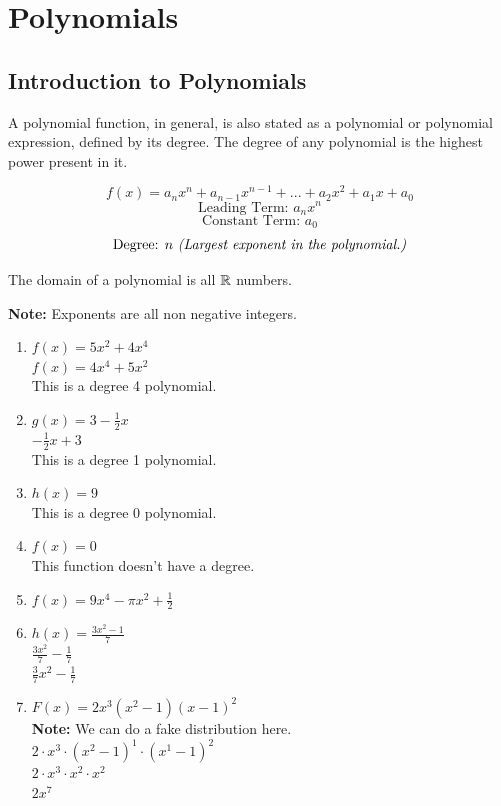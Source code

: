 \section{Polynomials}
\subsection{Introduction to Polynomials}
\begin{definition}
  A polynomial function, in general, is also stated as a polynomial or polynomial expression, defined by its degree. The degree of any polynomial is the highest power present in it.

  $$f(x) = a_nx^n + a_{n-1}x^{n-1} + ... + a_2x^2 + a_1x + a_0$$
  $$\text{Leading Term: } a_nx^n$$
  $$\text{Constant Term: } a_0$$
  $$\text{Degree: }n \text{ \textit{(Largest exponent in the polynomial.)}}$$


  The domain of a polynomial is all $\mathbb{R}$ numbers.
\end{definition}

\textbf{Note:} Exponents are all non negative integers.

\begin{example}
  \hfill
  \begin{enumerate}
  \item $f(x) = 5x^2 + 4x^4$ \\
    $f(x) = 4x^4 + 5x^2$ \\
    This is a degree 4 polynomial.
  \item $g(x) = 3-\frac{1}{2}x$ \\
    $-\frac{1}{2}x + 3$ \\
    This is a degree 1 polynomial.
  \item $h(x) = 9$ \\
    This is a degree 0 polynomial.
  \item $f(x) = 0$ \\
    This function doesn't have a degree.
  \item $f(x) = 9x^4 - \pi x^2 + \frac{1}{2}$
  \item $h(x) = \frac{3x^2 - 1}{7}$ \\
    $\frac{3x^2}{7} - \frac{1}{7}$ \\
    $\frac{3}{7}x^2 - \frac{1}{7}$
  \item $F(x) = 2x^3(x^2 - 1)(x - 1)^2$ \\
    \textbf{Note: }We can do a fake distribution here. \\
    $2 \cdot x^3 \cdot (x^2 - 1)^1 \cdot (x^1 - 1)^2$ \\
    $2 \cdot x^3 \cdot x^2 \cdot x^2$ \\
    $2x^7$ 
  \end{enumerate}
\end{example}

